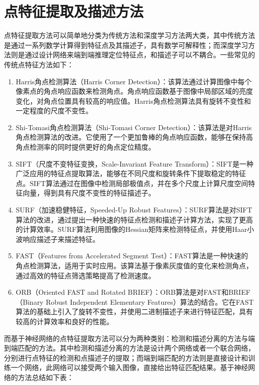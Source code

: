 \section{点特征提取及描述方法}
点特征提取方法可以简单地分类为传统方法和深度学习方法两大类，其中传统方法是通过一系列数学计算得到特征点及其描述子，具有数学可解释性；而深度学习方法则是通过设计网络来端到端推理定位特征点，和描述子可以不耦合。一些常见的传统点特征方法如下：
\begin{enumerate}
  \item Harris角点检测算法（Harris Corner Detection）：该算法通过计算图像中每个像素点的角点响应函数来检测角点。角点响应函数基于图像中局部区域的亮度变化，对角点位置具有较高的响应值。Harris角点检测算法具有旋转不变性和一定程度的尺度不变性。
  \item Shi-Tomasi角点检测算法（Shi-Tomasi Corner Detection）：该算法是对Harris角点检测算法的改进。它使用了一个更加鲁棒的角点响应函数，能够在保持高角点检测率的同时提供更好的角点定位精度。
  \item SIFT（尺度不变特征变换，Scale-Invariant Feature Transform）：SIFT是一种广泛应用的特征点提取算法，能够在不同尺度和旋转条件下提取稳定的特征点。SIFT算法通过在图像中检测局部极值点，并在多个尺度上计算尺度空间特征向量，得到具有尺度不变性的特征描述子。
  \item SURF（加速稳健特征，Speeded-Up Robust Features）：SURF算法是对SIFT算法的改进，通过提出一种快速的特征点检测和描述子计算方法，实现了更高的计算效率。SURF算法利用图像的Hessian矩阵来检测特征点，并使用Haar小波响应描述子来描述特征。
  \item FAST（Features from Accelerated Segment Test）：FAST算法是一种快速的角点检测算法，适用于实时应用。该算法基于像素灰度值的变化来检测角点，通过高效的特征点筛选策略提高了检测速度。
  \item ORB（Oriented FAST and Rotated BRIEF）：ORB算法是对FAST和BRIEF（Binary Robust Independent Elementary Features）算法的结合。它在FAST算法的基础上引入了旋转不变性，并使用二进制描述子来进行特征匹配，具有较高的计算效率和良好的性能。
\end{enumerate}
而基于神经网络的点特征提取方法可以分为两种类别：检测和描述分离的方法与端到端匹配的方法。其中检测和描述分离的方法是设计两个网络或者一个联合网络，分别进行点特征的检测和点描述子的提取；而端到端匹配的方法则是直接设计和训练一个网络，此网络可以接受两个输入图像，直接给出特征匹配结果。基于神经网络的方法总结如下表：
